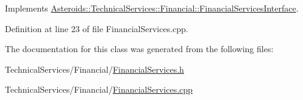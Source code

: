 Implements \hyperlink{classAsteroids_1_1TechnicalServices_1_1Financial_1_1FinancialServicesInterface_a4ad6d97c302ed9dc22b3528e56485d7d}{Asteroids\+::\+Technical\+Services\+::\+Financial\+::\+Financial\+Services\+Interface}.



Definition at line 23 of file Financial\+Services.\+cpp.



The documentation for this class was generated from the following files\+:\begin{DoxyCompactItemize}
\item 
Technical\+Services/\+Financial/\hyperlink{FinancialServices_8h}{Financial\+Services.\+h}\item 
Technical\+Services/\+Financial/\hyperlink{FinancialServices_8cpp}{Financial\+Services.\+cpp}\end{DoxyCompactItemize}
